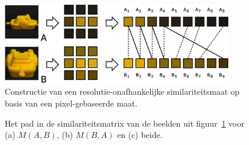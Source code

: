 
\begin{figure}[tbp]
\begin{center}
\includegraphics[width=10cm]{images/multires.eps}
\caption{\label{fig:multires}Constructie van een resolutie-onafhankelijke similariteitsmaat op basis van een pixel-gebaseerde maat.}
\end{center}
\end{figure}

\begin{figure}[tbp]
\begin{center}
\caption{\label{fig:multires_sim-matrices}Het pad in de similariteitsmatrix van de beelden uit 
figuur~\ref{fig:multires} voor (a) $M(A,B)$, (b) $M(B,A)$ en (c) beide.}
\end{center}
\end{figure}

